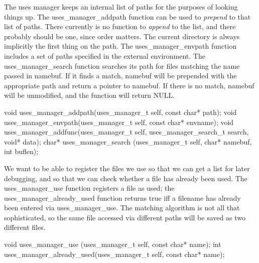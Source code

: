 The uses manager keeps an internal list of paths for the purposes
of looking things up.  The {\Tt{}uses{\_}manager{\_}addpath\nwendquote} function can
be used to \emph{prepend} to that list of paths.  There currently is no
function to \emph{append} to the list, and there probably
should be one, since order matters.  The current directory is
always implicitly the first thing on the path.  The {\Tt{}uses{\_}manager{\_}envpath\nwendquote}
function includes a set of paths specified in the external environment.
The {\Tt{}uses{\_}manager{\_}search\nwendquote} function searches its path for files
matching the name passed in {\Tt{}namebuf\nwendquote}.
If it finds a match, {\Tt{}namebuf\nwendquote} will be prepended with the appropriate
path and return a pointer to {\Tt{}namebuf\nwendquote}.  If there is no match,
namebuf will be unmodified, and the function will return NULL.

\nwenddocs{}\plusendmoddef\nwstartdeflinemarkup{}\nwenddeflinemarkup
void  uses_manager_addpath(uses_manager_t self, const char* path);
void  uses_manager_envpath(uses_manager_t self, const char* envname);
void  uses_manager_addfunc(uses_manager_t self, 
                                   uses_manager_search_t search,
                                   void* data);
char* uses_manager_search (uses_manager_t self, char* namebuf, 
                                   int buflen);

\nwendcode{}\nwdocspar

We want to be able to register the files we use so that
we can get a list for later debugging, and so that we can
check whether a file has already been used.  The {\Tt{}uses{\_}manager{\_}use\nwendquote}
function registers a file as used; the {\Tt{}uses{\_}manager{\_}already{\_}used\nwendquote}
function returns true iff a filename has already been entered via
{\Tt{}uses{\_}manager{\_}use\nwendquote}.  The matching algorithm is not all that sophisticated,
so the same file accessed via different paths will be saved as two different
files.

\nwenddocs{}\plusendmoddef\nwstartdeflinemarkup{}\nwenddeflinemarkup
void uses_manager_use         (uses_manager_t self, const char* name);
int  uses_manager_already_used(uses_manager_t self, const char* name);
\nwendcode{}\nwdocspar


